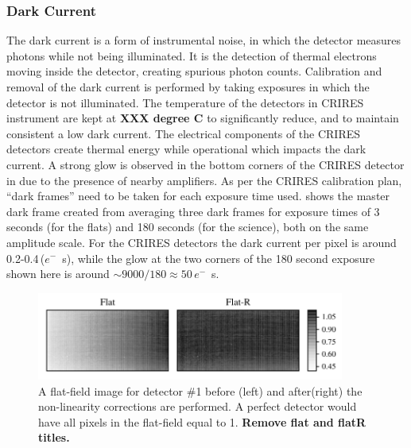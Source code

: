 \subsubsection{Dark Current}
\label{subsubsec:darkcurrent}
The dark current is a form of instrumental noise, in which the detector measures photons while not being illuminated. It is the detection of thermal electrons moving inside the detector, creating spurious photon counts. Calibration and removal of the dark current is performed by taking exposures in which the detector is not illuminated. 
 The temperature of the detectors in CRIRES instrument are kept at \textbf{XXX degree C} to significantly reduce, and to maintain consistent a low dark current. The electrical components of the CRIRES detectors create thermal energy while operational which impacts the dark current. A strong glow is observed in the bottom corners of the CRIRES detector in  due to the presence of nearby amplifiers. As per the CRIRES calibration plan, ``dark frames'' need to be taken for each exposure time used.  shows the master dark frame created from averaging three dark frames for exposure times of 3 seconds (for the flats) and 180 seconds (for the science), both on the same amplitude scale.
For the CRIRES detectors the dark current per pixel is around 0.2-0.4\,(\(e^{-}\)\si{\per\second}), while the glow at the two corners of the 180 second exposure shown here is around \(\sim9000 / 180\approx50\)\,\(e^{-}\)\si{\per\second}.


\begin{figure}[h]
    \centering
    \includegraphics[width=0.9\textwidth]{figures/reduction/master_flats_1.pdf}
    \caption{A flat-field image for detector \#1 before (left) and after(right) the non-linearity corrections are performed. A perfect detector would have all pixels in the flat-field equal to 1. \bf{\red Remove flat and flatR titles.}}
    \label{fig:masterflats}
\end{figure}


